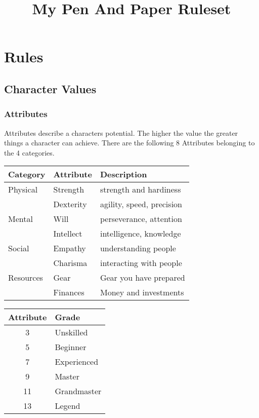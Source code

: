 \documentclass[11pt]{article}
\date{}
\title{My Pen And Paper Ruleset}
\begin{document}
\maketitle
{

\section{Rules}
\label{sec:org741df85}

\begin{multicols}{2}[]
\subsection{Character Values}
\label{sec:org3832955}
\subsubsection{Attributes}
\label{sec:org092e053}
Attributes describe a characters potential. The higher the value the greater things a character can achieve. There are the following 8 Attributes belonging to the 4 categories.

\begin{center}
\begin{tabular}{lll}
\textbf{Category} & \textbf{Attribute} & \textbf{Description}\\
\hline
Physical & Strength & strength and hardiness\\
 & Dexterity & agility, speed, precision\\
\hline
Mental & Will & perseverance, attention\\
 & Intellect & intelligence, knowledge\\
\hline
Social & Empathy & understanding people\\
 & Charisma & interacting with people\\
\hline
Resources & Gear & Gear you have prepared\\
 & Finances & Money and investments\\
\end{tabular}
\end{center}

\begin{center}
\begin{tabular}{c|l}
\textbf{Attribute} & \textbf{Grade}\\
\hline
3 & Unskilled\\
5 & Beginner\\
7 & Experienced\\
9 & Master\\
11 & Grandmaster\\
13 & Legend\\
\end{tabular}
\end{center}


\end{multicols}}
\end{document}
